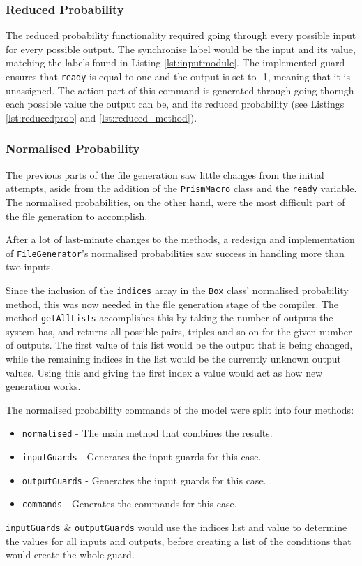 \documentclass[report.tex]{subfiles}
\begin{document}
\subsubsection{Reduced Probability} %
\label{ssub:reduced_probability}
The reduced probability functionality required going through every possible
input for every possible output. The synchronise label would be the input and
its value, matching the labels found in Listing \ref{lst:inputmodule}. The
implemented guard ensures that \texttt{ready} is equal to one and the output
is set to -1, meaning that it is unassigned. The action part of this command is
generated through going thorugh each possible value the output can be, and its
reduced probability (see Listings \ref{lst:reducedprob} and 
\ref{lst:reduced_method}).

\subsubsection{Normalised Probability} %
\label{ssub:normalised_probability}
The previous parts of the file generation saw little changes from the initial
attempts, aside from the addition of the \texttt{PrismMacro} class and the
\texttt{ready} variable. The normalised probabilities, on the other hand, were
the most difficult part of the file generation to accomplish. 

After a lot of last-minute changes to the methods, a redesign and implementation
of \texttt{FileGenerator}'s normalised probabilities saw success in handling
more than two inputs.

Since the inclusion of the \texttt{indices} array in the \texttt{Box} class'
normalised probability method, this was now needed in the file generation stage
of the compiler. The method \texttt{getAllLists} accomplishes this by taking
the number of outputs the system has, and returns all possible pairs, triples
and so on for the given number of outputs. The first value of this list would
be the output that is being changed, while the remaining indices in the list
would be the currently unknown output values. Using this and giving the
first index a value would act as how new generation works.

The normalised probability commands of the model were split into four methods:
\begin{itemize}
    \item \texttt{normalised} - The main method that combines the results.
    \item \texttt{inputGuards} - Generates the input guards for this case.
    \item \texttt{outputGuards} - Generates the input guards for this case.
    \item \texttt{commands} - Generates the commands for this case.
\end{itemize}
\texttt{inputGuards} \& \texttt{outputGuards} would use the indices list and
value to determine the values for all inputs and outputs, before creating a list
of the conditions that would create the whole guard.
\end{document}

